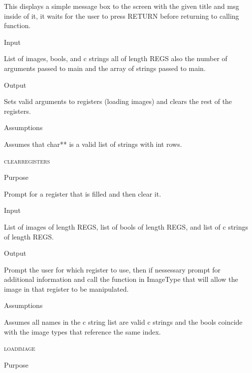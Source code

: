 \documentclass[pdftex, 11pt]{article}
\begin{document}
\begin{description}
\begin{description}
				This displays a simple message box to the screen with the given title and msg
				inside of it, it waits for the user to press RETURN before returning to
				calling function.

			\item{Input}

				List of images, bools, and c strings all of length REGS
				also the number of arguments passed to main and the array
				of strings passed to main.

			\item{Output}

				Sets valid arguments to registers (loading images) and
				clears the rest of the registers.

			\item{Assumptions}

				Assumes that char** is a valid list of strings with int
				rows.

		\end{description}



	\item{\textsc{clearregisters}}
		\begin{description}
			\item{Purpose}

				Prompt for a register that is filled and then clear it.
				
			\item{Input}

				List of images of length REGS, list of bools of length
				REGS, and list of c strings of length REGS.

			\item{Output}

				Prompt the user for which register to use, then if nessessary
				prompt for additional information and call the function
				in ImageType that will allow the image in that register to
				be manipulated.

			\item{Assumptions}

				Assumes all names in the c string list are valid c
				strings and the bools coincide with the image types that
				reference the same index.

		\end{description}



	\item{\textsc{loadimage}}
		\begin{description}
			\item{Purpose}


\end{description}
\end{description}
\end{document}

